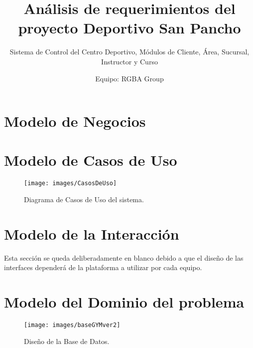 \documentclass[oneside,10pt]{book}
\title{Análisis de requerimientos del proyecto Deportivo San Pancho}
\subtitle{Sistema de Control del Centro Deportivo, Módulos de Cliente, Área, Sucursal, Instructor y Curso}
\author{Equipo: RGBA Group}
\begin{document}
\maketitle
\thispagestyle{empty}

\frontmatter
\tableofcontents

\mainmatter

\chapter{Modelo de Negocios}


\chapter{Modelo de Casos de Uso}

\begin{figure}[htbp!]
		\centering
			\texttt{[image: images/CasosDeUso]}
		\caption{Diagrama de Casos de Uso del sistema.}
	\end{figure}
	

\chapter{Modelo de la Interacción}

{\color{UCInterfaceColor} 
	Esta sección se queda deliberadamente en blanco debido a que el diseño de las interfaces dependerá de la plataforma a utilizar por cada equipo.\\	
}



\chapter{Modelo del Dominio del problema}

	\begin{figure}[htbp!]
		\centering
			\texttt{[image: images/baseGYMver2]}
		\caption{Diseño de la Base de Datos.}
	\end{figure}
	
\end{document}
